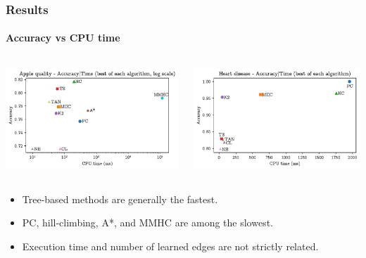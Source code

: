 \documentclass{beamer}
\begin{document}
\begin{frame}
    \frametitle{Results}
    \framesubtitle{Accuracy vs CPU time}

    \begin{columns}
        \begin{center}
            \includegraphics[width=\linewidth]{./img/apple_time.pdf}
        \end{center}

        \begin{center}
            \includegraphics[width=\linewidth]{./img/heart_time.pdf}
        \end{center}
    \end{columns}

    \begin{itemize}
        \small
        \item Tree-based methods are generally the fastest.
        \item PC, hill-climbing, A*, and MMHC are among the slowest.
        \item Execution time and number of learned edges are not strictly related.
    \end{itemize}
\end{frame}
\end{document}
